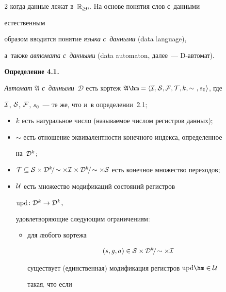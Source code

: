 \begin{multicols}{2}
когда данные лежат в~$\mathbb{R}_{\ge 0}$. На основе понятия слов  с~данными 


 естественным


образом вводится понятие \textit{языка с~данными} (data language), 


а~также \textit{автомата с~данными} (data automaton, далее~--- D-ав\-томат).


\smallskip





\noindent


\textbf{Определение 4.1.}\




\textit{Автомат $\mathfrak A$ с~данными~$\mathcal D$} есть кортеж $\mathfrak A


\hm=\langle\Cal I,\Cal S,\Cal F,\Cal T,k,\sim~,s_0\rangle$, где 


$\mathcal I$, $\mathcal S$, $\mathcal F$, $s_0$~--- те же, что и~в определении~2.1;


\begin{itemize}


\item $k$ есть натуральное число  (называемое числом регистров данных);


\item $\sim$ есть отношение эквивалентности конечного индекса, определенное


на~$\mathcal D^k$;


\item $\Cal T\subseteq \Cal S\times\Cal D^k\fac\sim\times\Cal I\times 


\Cal D^k\fac\sim\times\Cal S$ есть конечное множество переходов;


\item $\mathcal U$ есть множество модификаций состояний регистров 


$\mathrm{upd}\colon \mathcal D^k\to\mathcal D^k$,


удовлетворяющие следующим ограничениям:


\begin{itemize}


\item для любого кортежа 


$$


(s,g,a)\in\Cal S\times \Cal D^k\fac\sim\times \Cal I


$$ 


существует (единственная) модификация регистров $\mathrm{upd}\hm\in\Cal U$


такая, что если



\end{itemize}
\end{itemize}
\end{multicols}
